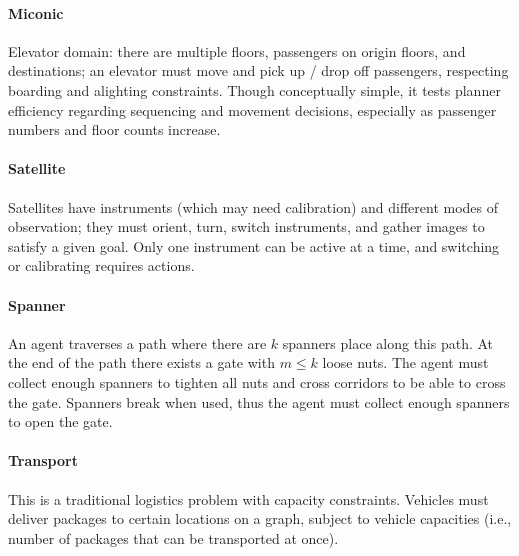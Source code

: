 \documentclass{article}
\begin{document}
\paragraph{Miconic}

Elevator domain: there are multiple floors, passengers on origin floors, and
destinations; an elevator must move and pick up / drop off passengers,
respecting boarding and alighting constraints. Though conceptually simple, it
tests planner efficiency regarding sequencing and movement decisions, especially
as passenger numbers and floor counts increase.

\paragraph{Satellite}

Satellites have instruments (which may need calibration) and different modes of
observation; they must orient, turn, switch instruments, and gather images to
satisfy a given goal. Only one instrument can be active at a time, and switching
or calibrating requires actions.

\paragraph{Spanner}

An agent traverses a path where there are $k$ spanners place along this path. At
the end of the path there exists a gate with $m \leq k$ loose nuts. The agent
must collect enough spanners to tighten all nuts and cross corridors to be able
to cross the gate. Spanners break when used, thus the agent must collect enough
spanners to open the gate.

\paragraph{Transport}

This is a traditional logistics problem with capacity constraints. Vehicles must
deliver packages to certain locations on a graph, subject to vehicle capacities
(i.e., number of packages that can be transported at once).
\end{document}
